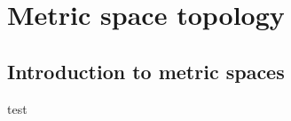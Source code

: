 \documentclass[class=article, crop=false]{standalone}
\begin{document}
\section{Metric space topology}

\subsection{Introduction to metric spaces}

test
\end{document}
